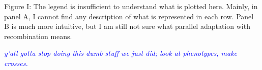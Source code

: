 \documentclass[onecolumn,oneside,letterpaper]{article}
\newcommand{\jri}[1]{\textcolor{blue}{ \emph{\scriptsize  #1}} }
\begin{document}
Figure I: The legend is insufficient to understand what is plotted here. Mainly, in panel A, I cannot find any description of what is represented in each row. Panel B is much more intuitive, but I am still not sure what parallel adaptation with recombination means.  

\jri{y'all gotta stop doing this dumb stuff we just did; look at phenotypes, make crosses.}


\end{document}
